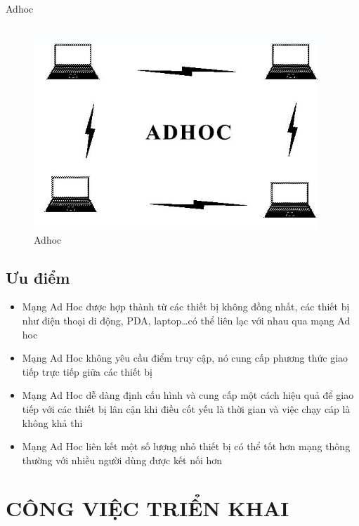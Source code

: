 \documentclass[12pt,a4paper]{report}
\begin{document}
\begin{center}Adhoc
\begin{figure}[htp]
	\begin{center}
		\includegraphics[scale=.6]{Ad.png}
	\end{center}
	\caption{Adhoc}
	\label{refhinh1}
\end{figure}
\end{center}

\section{Ưu điểm}
\begin{itemize}
	\item Mạng Ad Hoc được hợp thành từ các thiết bị không đồng nhất, các thiết bị như điện thoại di động, PDA, laptop…có thể liên lạc với nhau qua mạng Ad hoc
	\item Mạng Ad Hoc không yêu cầu điểm truy cập, nó cung cấp phương thức giao tiếp trực tiếp giữa các thiết bị
	\item Mạng Ad Hoc dễ dàng định cấu hình và cung cấp một cách hiệu quả để giao tiếp với các thiết bị lân cận khi điều cốt yếu là thời gian và việc chạy cáp là không khả thi
	\item Mạng Ad Hoc liên kết một số lượng nhỏ thiết bị có thể tốt hơn mạng thông thường với nhiều người dùng được kết nối hơn
\end{itemize}

\newpage         %
\chapter{CÔNG VIỆC TRIỂN KHAI}                    %
\end{document}
